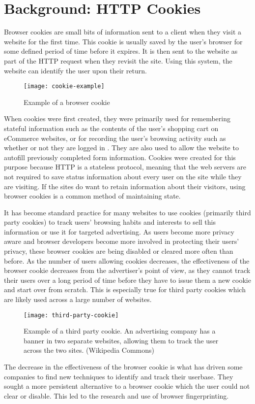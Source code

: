 \chapter{Background: HTTP Cookies}

Browser cookies are small bits of information sent to a client when they visit a website for the first time.
This cookie is usually saved by the user's browser for some defined period of time before it expires.
It is then sent to the website as part of the HTTP request when they revisit the site.
Using this system, the website can identify the user upon their return.

\begin{figure}[h]
\texttt{[image: cookie-example]}
\centering
\caption{Example of a browser cookie}
\end{figure}

When cookies were first created, they were primarily used for remembering stateful information such as the contents of the user's shopping cart on eCommerce websites, or for recording the user's browsing activity such as whether or not they are logged in \citep{cookiesbackground}.
They are also used to allow the website to autofill previously completed form information.
Cookies were created for this purpose because HTTP is a stateless protocol, meaning that the web servers are not required to save status information about every user on the site while they are visiting.
If the sites do want to retain information about their visitors, using browser cookies is a common method of maintaining state.

It has become standard practice for many websites to use cookies (primarily third party cookies) to track users' browsing habits and interests to sell this information or use it for targeted advertising.
As users become more privacy aware and browser developers become more involved in protecting their users' privacy, these browser cookies are being disabled or cleared more often than before.
As the number of users allowing cookies decreases, the effectiveness of the browser cookie decreases from the advertiser's point of view, as they cannot track their users over a long period of time before they have to issue them a new cookie and start over from scratch.
This is especially true for third party cookies which are likely used across a large number of websites.

\begin{figure}[h]
\texttt{[image: third-party-cookie]}
\centering
\caption{Example of a third party cookie.
An advertising company has a banner in two separate websites, allowing them to track the user across the two sites. (Wikipedia Commons)}
\end{figure}

The decrease in the effectiveness of the browser cookie is what has driven some companies to find new techniques to identify and track their userbase.
They sought a more persistent alternative to a browser cookie which the user could not clear or disable.
This led to the research and use of browser fingerprinting.

